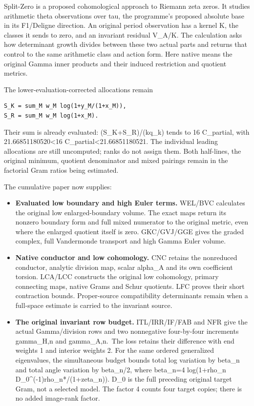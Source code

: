 \documentclass[
]{article}
\providecommand{\tightlist}{%
  \setlength{\itemsep}{0pt}\setlength{\parskip}{0pt}}
\begin{document}
Split-Zero is a proposed cohomological approach to Riemann zeta zeros.
It studies arithmetic theta observations over tau, the programme's
proposed absolute base in its F1/Deligne direction. An original period
observation has a kernel K, the classes it sends to zero, and an
invariant residual V\_A/K. The calculation asks how determinant growth
divides between these two actual parts and returns that control to the
same arithmetic class and action form. Here native means the original
Gamma inner products and their induced restriction and quotient metrics.

The lower-evaluation-corrected allocations remain

\begin{verbatim}
S_K = sum_M w_M log(1+y_M/(1+x_M)),
S_R = sum_M w_M log(1+x_M).
\end{verbatim}

Their sum is already evaluated: (S\_K+S\_R)/(kq\_k) tends to 16
C\_partial, with 21.66851180520\textless16
C\_partial\textless21.66851180521. The individual leading allocations
are still uncomputed; ranks do not assign them. Both half-lines, the
original minimum, quotient denominator and mixed pairings remain in the
factorial Gram ratios being estimated.

The cumulative paper now supplies:

\begin{itemize}
\tightlist
\item
  \textbf{Evaluated low boundary and high Euler terms.} WEL/BVC
  calculates the original low enlarged-boundary volume. The exact maps
  return its nonzero boundary form and full mixed numerator to the
  original metric, even where the enlarged quotient itself is zero.
  GKC/GVJ/GGE gives the graded complex, full Vandermonde transport and
  high Gamma Euler volume.
\item
  \textbf{Native conductor and low cohomology.} CNC retains the
  nonreduced conductor, analytic division map, scalar alpha\_A and its
  own coefficient torsion. LCA/LCC constructs the original low
  cohomology, primary connecting maps, native Grams and Schur quotients.
  LFC proves their short contraction bounds. Proper-source compatibility
  determinants remain when a full-space estimate is carried to the
  invariant source.
\item
  \textbf{The original invariant row budget.} ITL/IRR/IF/FAB and NFR
  give the actual Gamma/division rows and two nonnegative four-by-four
  increments gamma\_H,n and gamma\_A,n.~The loss retains their
  difference with end weights 1 and interior weights 2. For the same
  ordered generalized eigenvalues, the simultaneous budget bounds total
  log variation by beta\_n and total angle variation by beta\_n/2, where
  beta\_n=4 log(1+rho\_n D\_0\^{}(-1)rho\_n*/(1+zeta\_n)). D\_0 is the
  full preceding original target Gram, not a selected model. The factor
  4 counts four target copies; there is no added image-rank factor.
\end{itemize}
\end{document}

